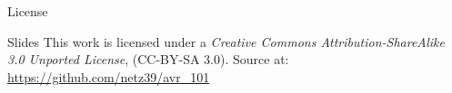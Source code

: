 \documentclass{beamer}
\begin{document}
\begin{frame}{License}
    \begin{block}{Slides}
        This work is licensed under a \emph{Creative Commons
        Attribution-ShareAlike 3.0 Unported License}, (CC-BY-SA 3.0).
        Source at: \url{https://github.com/netz39/avr_101}
    \end{block}
\end{frame}
\end{document}
